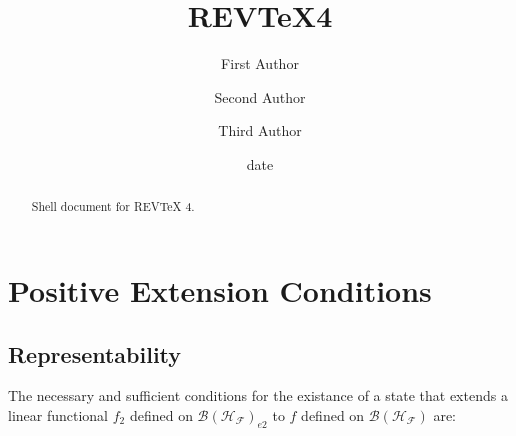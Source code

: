 \documentclass[aps,preprint]{revtex4}%
\begin{document}
\title[Short title for running header]{REV\TeX4}
\author{First Author}
\author{Second Author}
\author{Third Author}

\begin{abstract}
Shell document for REV\TeX{} 4.

\end{abstract}
\date[Date text]{date}




\maketitle
\tableofcontents


\section{Positive Extension Conditions}

\subsection{Representability}

The necessary and sufficient conditions for the existance of a state that
extends a linear functional $f_{2}$ defined on $\mathcal{B}\left(
\mathcal{H}_{\mathcal{F}}\right)  _{e2}$ to $f$ defined on $\mathcal{B}\left(
\mathcal{H}_{\mathcal{F}}\right)  $ are:
\end{document}

